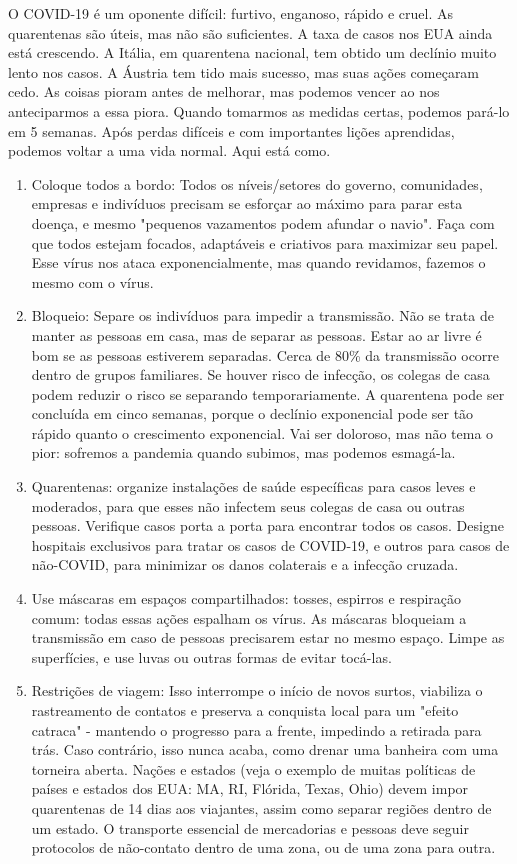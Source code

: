 \documentclass[onecolumn,journal]{IEEEtran}
\begin{document}
\begin{multicols}{2}


O COVID-19 é um oponente difícil: furtivo, enganoso, rápido e cruel. As quarentenas são úteis, mas não são suficientes. A taxa de casos nos EUA ainda está crescendo. A Itália, em quarentena nacional, tem obtido um declínio muito lento nos casos. A Áustria tem tido mais sucesso, mas suas ações começaram cedo. As coisas pioram antes de melhorar, mas podemos vencer ao nos anteciparmos a essa piora. Quando tomarmos as medidas certas, podemos pará-lo em 5 semanas. Após perdas difíceis e com importantes lições aprendidas, podemos voltar a uma vida normal. Aqui está como.

\begin{enumerate}
    \item Coloque todos a bordo: Todos os níveis/setores do governo, comunidades, empresas e indivíduos precisam se esforçar ao máximo para parar esta doença, e mesmo "pequenos vazamentos podem afundar o navio". Faça com que todos estejam focados, adaptáveis e criativos para maximizar seu papel. Esse vírus nos ataca exponencialmente, mas quando revidamos, fazemos o mesmo com o vírus.
    \item Bloqueio: Separe os indivíduos para impedir a transmissão. Não se trata de manter as pessoas em casa, mas de separar as pessoas. Estar ao ar livre é bom se as pessoas estiverem separadas. Cerca de 80\% da transmissão ocorre dentro de grupos familiares. Se houver risco de infecção, os colegas de casa podem reduzir o risco se separando temporariamente. A quarentena pode ser concluída em cinco semanas, porque o declínio exponencial pode ser tão rápido quanto o crescimento exponencial. Vai ser doloroso, mas não tema o pior: sofremos a pandemia quando subimos, mas podemos esmagá-la.
    \item Quarentenas: organize instalações de saúde específicas para casos leves e moderados, para que esses não infectem seus colegas de casa ou outras pessoas. Verifique casos porta a porta para encontrar todos os casos. Designe hospitais exclusivos para tratar os casos de COVID-19, e outros para casos de não-COVID, para minimizar os danos colaterais e a infecção cruzada.
    \item Use máscaras em espaços compartilhados: tosses, espirros e respiração comum: todas essas ações espalham os vírus. As máscaras bloqueiam a transmissão em caso de pessoas precisarem estar no mesmo espaço. Limpe as superfícies, e use luvas ou outras formas de evitar tocá-las.
    \item Restrições de viagem: Isso interrompe o início de novos surtos, viabiliza o rastreamento de contatos e preserva a conquista local para um "efeito catraca" - mantendo o progresso para a frente, impedindo a retirada para trás. Caso contrário, isso nunca acaba, como drenar uma banheira com uma torneira aberta. Nações e estados (veja o exemplo de muitas políticas de países e estados dos EUA: MA, RI, Flórida, Texas, Ohio) devem impor quarentenas de 14 dias aos viajantes, assim como separar regiões dentro de um estado. O transporte essencial de mercadorias e pessoas deve seguir protocolos de não-contato dentro de uma zona, ou de uma zona para outra.

\end{enumerate}
\end{multicols}
\end{document}
